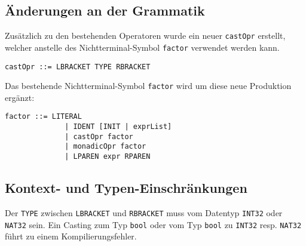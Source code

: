 \documentclass[10pt, a4paper, twocolumn]{article} %
\begin{document}
\subsection{Änderungen an der Grammatik}
Zusätzlich zu den bestehenden Operatoren wurde ein neuer \texttt{castOpr} erstellt, welcher anstelle des Nichtterminal-Symbol \texttt{factor} verwendet werden kann.
\begin{lstlisting}[backgroundcolor = \color{lightgray},
xleftmargin = 0.05cm,
framexleftmargin = 0.05em]
    castOpr ::= LBRACKET TYPE RBRACKET
\end{lstlisting}
Das bestehende Nichtterminal-Symbol \texttt{factor} wird um diese neue Produktion ergänzt:
\begin{lstlisting}[backgroundcolor = \color{lightgray},
xleftmargin = 0.05cm,
framexleftmargin = 0.05em]
    factor ::= LITERAL
              | IDENT [INIT | exprList]
              | castOpr factor
              | monadicOpr factor
              | LPAREN expr RPAREN
\end{lstlisting}

\subsection{Kontext- und Typen-Einschränkungen}
Der \texttt{TYPE} zwischen \texttt{LBRACKET} und \texttt{RBRACKET} muss vom Datentyp \texttt{INT32} oder \texttt{NAT32} sein.
Ein Casting zum Typ \texttt{bool} oder vom Typ \texttt{bool} zu \texttt{INT32} resp. \texttt{NAT32} führt zu einem Kompilierungsfehler.
\end{document}
